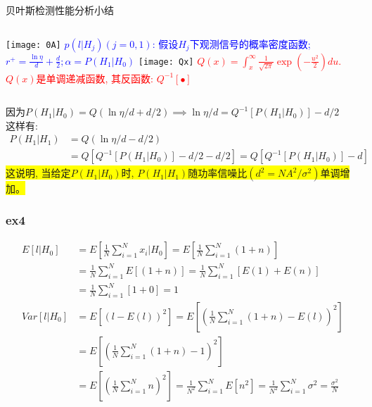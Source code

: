 \begin{frame}{贝叶斯检测性能分析小结}
\begin{columns}
	\texttt{[image: 0A]}
	\scriptsize
	\textcolor{blue}{$p(l|H_j)(j=0,1)$: 假设$H_j$下观测信号的概率密度函数; $r^+=\frac{\ln\eta}{d}+\frac{d}{2}; \alpha=P(H_1|H_0)$}
	\texttt{[image: Qx]}
	\scriptsize
	\textcolor{red}{$Q(x)=\int_{x}^{\infty}\frac{1}{\sqrt{2\pi}}\exp(-\frac{u^2}{2})du$.}\\
	\textcolor{red}{$Q(x)$是单调递减函数, 其反函数: $Q^{-1}[\bullet]$}
\end{columns}

\bigskip

 因为$P(H_1|H_0)=Q(\ln\eta/d+d/2) \implies \ln\eta/d=Q^{-1}[P(H_1|H_0)]-d/2$\\
这样有:
\begin{align*}
P(H_1|H_1)&=Q\left(\ln\eta/d-d/2\right)\\
&=Q[Q^{-1}[P(H_1|H_0)]-d/2-d/2]=Q[Q^{-1}[P(H_1|H_0)]-d]
\end{align*}
\colorbox{yellow}{这说明, 当给定$P(H_1|H_0)$时, $P(H_1|H_1)$随功率信噪比$(d^2=NA^2/\sigma^2)$单调增加。} 
\end{frame}

\begin{frame}[shrink]
\frametitle{ex4}
\begin{align*}
E[l|H_0]&=E\left[\frac{1}{N}\sum\limits_{i=1}^{N}x_i|H_0\right]=E\left[\frac{1}{N}\sum\limits_{i=1}^{N}(1+n)\right]\\
&=\frac{1}{N}\sum\limits_{i=1}^{N}E[(1+n)]=\frac{1}{N}\sum\limits_{i=1}^{N}[E(1)+E(n)]\\
&=\frac{1}{N}\sum\limits_{i=1}^{N}[1+0]=1\\
Var[l|H_0]&=E\left[(l-E(l))^2\right]=E\left[\left(\frac{1}{N}\sum\limits_{i=1}^{N}(1+n)-E(l)\right)^2\right]\\
&=E\left[\left(\frac{1}{N}\sum\limits_{i=1}^{N}(1+n)-1\right)^2\right]\\
&=E\left[(\frac{1}{N}\sum\limits_{i=1}^{N}n)^2\right]=\frac{1}{N^2}\sum\limits_{i=1}^{N}E[n^2]=\frac{1}{N^2}\sum\limits_{i=1}^{N}\sigma^2=\frac{\sigma^2}{N}
\end{align*}
\end{frame}

